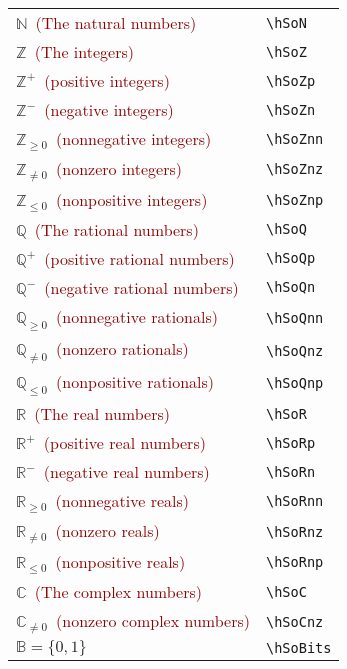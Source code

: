 \documentclass[a4paper,10pt,landscape]{article}
\theoremstyle{definition}
\theoremstyle{remark}
\newcommand{\hDesc}[1]{\textcolor{darkred}{(#1)}} %
\newcommand{\hSoN}  {\ensuremath{\mathbb{N}}}      %
\newcommand{\hSoNp} {\ensuremath{\mathbb{N}^{+}}} %
\newcommand{\hSoZ}  {\ensuremath{\mathbb{Z}}}      %
\newcommand{\hSoZp} {\ensuremath{\mathbb{Z}^{+}}} %
\newcommand{\hSoZn} {\ensuremath{\mathbb{Z}^{-}}} %
\newcommand{\hSoZnn}{\ensuremath{\mathbb{Z}_{\ge 0}}} %
\newcommand{\hSoZnz}{\ensuremath{\mathbb{Z}_{\neq 0}}} %
\newcommand{\hSoZnp}{\ensuremath{\mathbb{Z}_{\le 0}}} %
\newcommand{\hSoQ}  {\ensuremath{\mathbb{Q}}}      %
\newcommand{\hSoQp} {\ensuremath{\mathbb{Q}^{+}}} %
\newcommand{\hSoQn} {\ensuremath{\mathbb{Q}^{-}}} %
\newcommand{\hSoQnn}{\ensuremath{\mathbb{Q}_{\ge 0}}} %
\newcommand{\hSoQnz}{\ensuremath{\mathbb{Q}_{\neq 0}}} %
\newcommand{\hSoQnp}{\ensuremath{\mathbb{Q}_{\le 0}}} %
\newcommand{\hSoR}  {\ensuremath{\mathbb{R}}}      %
\newcommand{\hSoRp} {\ensuremath{\mathbb{R}^{+}}} %
\newcommand{\hSoRn} {\ensuremath{\mathbb{R}^{-}}} %
\newcommand{\hSoRnn}{\ensuremath{\mathbb{R}_{\ge 0}}} %
\newcommand{\hSoRnz}{\ensuremath{\mathbb{R}_{\neq 0}}} %
\newcommand{\hSoRnp}{\ensuremath{\mathbb{R}_{\le 0}}} %
\newcommand{\hSoC}  {\ensuremath{\mathbb{C}}}      %
\newcommand{\hSoCnz}{\ensuremath{\mathbb{C}_{\neq 0}}} %
\newcommand{\hSoPrimes}{\ensuremath{\mathbb{P}}} %
\newcommand{\hSoTruth}{\ensuremath{\left \{ T, F \right \}}} %
\newcommand{\hSoBits}{\ensuremath{\mathbb{B}}} %
\newcommand{\hSoFunctions}[2]{\ensuremath{#2^{#1}}} %
\newcommand{\hSoSubsets}[1]{\ensuremath{2^{#1}}} %
\newcommand{\hSoPowerSet}[1]{\ensuremath{\mathcal{P}(#1)}} %
\begin{document}
\begin{multicols}{3}
\begin{tabular}{@{}ll@{}}
	\hSoN\ 	\hDesc{The natural numbers}	&\verb!\hSoN!\\
	\hSoZ\ 	\hDesc{The integers}	&\verb!\hSoZ!\\
	\hSoZp\ 	\hDesc{positive integers}	&\verb!\hSoZp!\\
	\hSoZn\	\hDesc{negative integers}	&\verb!\hSoZn! \\
	\hSoZnn\	\hDesc{nonnegative integers}	&\verb!\hSoZnn!\\
	\hSoZnz\	\hDesc{nonzero integers}	&\verb!\hSoZnz!\\
	\hSoZnp\	\hDesc{nonpositive integers}	&\verb!\hSoZnp!\\
	\hSoQ\	\hDesc{The rational numbers}	&\verb!\hSoQ!\\
	\hSoQp\	\hDesc{positive rational numbers}	&\verb!\hSoQp!\\
	\hSoQn\	\hDesc{negative rational numbers}	&\verb!\hSoQn!\\
	\hSoQnn\	\hDesc{nonnegative rationals}	&\verb!\hSoQnn!\\
	\hSoQnz\	\hDesc{nonzero rationals}	&\verb!\hSoQnz!\\
	\hSoQnp\	\hDesc{nonpositive rationals}	&\verb!\hSoQnp!\\
	\hSoR\	\hDesc{The real numbers}	&\verb!\hSoR!\\
	\hSoRp\	\hDesc{positive real numbers}	&\verb!\hSoRp!\\
	\hSoRn\	\hDesc{negative real numbers}	&\verb!\hSoRn!\\
	\hSoRnn\	\hDesc{nonnegative reals}	&\verb!\hSoRnn!\\
	\hSoRnz\	\hDesc{nonzero reals}	&\verb!\hSoRnz!\\
	\hSoRnp\	\hDesc{nonpositive reals}	&\verb!\hSoRnp!\\
	\hSoC\	\hDesc{The complex numbers}	&\verb!\hSoC!\\
	\hSoCnz\	\hDesc{nonzero complex numbers}	&\verb!\hSoCnz!\\
	$\hSoBits = \{ 0, 1 \}$	&\verb!\hSoBits!\\
\end{tabular}





\end{multicols}
\end{document}
